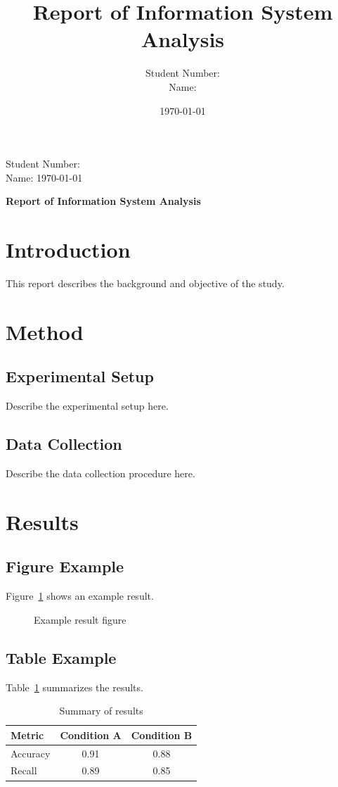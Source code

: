 \documentclass[a4paper,12pt]{jsarticle}
\title{Report of Information System Analysis}
\author{Student Number: \shownstudentnumber\\
Name: \shownstudentname}
\date{\today}
\newif\ifredactpersonalinfo
\newcommand{\studentnumber}{\texttt{6930\mbox{-}38\mbox{-}5047}}
\newcommand{\studentname}{Ye CHENG (程 ヨウ)}
\newcommand{\redact}[1]{\colorbox{black}{\rule{0pt}{1.2em}\rule{#1}{0pt}}}
\newcommand{\maybeRedact}[2]{\ifredactpersonalinfo\redact{#1}\else #2\fi}
\newcommand{\shownstudentnumber}{\maybeRedact{34mm}{\studentnumber}}
\newcommand{\shownstudentname}{\maybeRedact{42mm}{\studentname}}
\begin{document}
\begin{flushright}
Student Number: \shownstudentnumber\\
Name: \shownstudentname\quad
\today
\end{flushright}

\begin{center}
{\LARGE\bfseries Report of Information System Analysis\par}
\end{center}

\section{Introduction}
This report describes the background and objective of the study.

\section{Method}
\subsection{Experimental Setup}
Describe the experimental setup here.

\subsection{Data Collection}
Describe the data collection procedure here.

\section{Results}
\subsection{Figure Example}
Figure~\ref{fig:example} shows an example result.

\begin{figure}[htbp]
  \centering
  \fbox{\rule{0pt}{40mm}\rule{0.7\textwidth}{0pt}}
  \caption{Example result figure}\label{fig:example}
\end{figure}

\subsection{Table Example}
Table~\ref{tab:example} summarizes the results.

\begin{table}[htbp]
  \centering
  \caption{Summary of results}\label{tab:example}
  \begin{tabular}{lcc}
    \toprule
    Metric & Condition A & Condition B \\
    \midrule
    Accuracy & 0.91 & 0.88 \\
    Recall & 0.89 & 0.85 \\
    \bottomrule
  \end{tabular}
\end{table}
\end{document}
